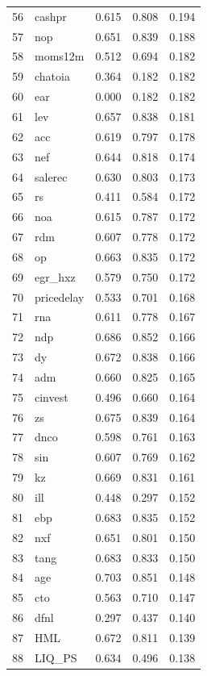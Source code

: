 \documentclass[12pt]{article}
\begin{document}
\begin{footnotesize}
\begin{longtable}{rl|c|c|c}
		56 & cashpr & 0.615 & 0.808 & 0.194 \\ 
		57 & nop & 0.651 & 0.839 & 0.188 \\ 
		58 & moms12m & 0.512 & 0.694 & 0.182 \\ 
		59 & chatoia & 0.364 & 0.182 & 0.182 \\ 
		60 & ear & 0.000 & 0.182 & 0.182 \\ 
		61 & lev & 0.657 & 0.838 & 0.181 \\ 
		62 & acc & 0.619 & 0.797 & 0.178 \\ 
		63 & nef & 0.644 & 0.818 & 0.174 \\ 
		64 & salerec & 0.630 & 0.803 & 0.173 \\ 
		65 & rs & 0.411 & 0.584 & 0.172 \\ 
		66 & noa & 0.615 & 0.787 & 0.172 \\ 
		67 & rdm & 0.607 & 0.778 & 0.172 \\ 
		68 & op & 0.663 & 0.835 & 0.172 \\ 
		69 & egr\_hxz & 0.579 & 0.750 & 0.172 \\ 
		70 & pricedelay & 0.533 & 0.701 & 0.168 \\ 
		71 & rna & 0.611 & 0.778 & 0.167 \\ 
		72 & ndp & 0.686 & 0.852 & 0.166 \\ 
		73 & dy & 0.672 & 0.838 & 0.166 \\ 
		74 & adm & 0.660 & 0.825 & 0.165 \\ 
		75 & cinvest & 0.496 & 0.660 & 0.164 \\ 
		76 & zs & 0.675 & 0.839 & 0.164 \\ 
		77 & dnco & 0.598 & 0.761 & 0.163 \\ 
		78 & sin & 0.607 & 0.769 & 0.162 \\ 
		79 & kz & 0.669 & 0.831 & 0.161 \\ 
		80 & ill & 0.448 & 0.297 & 0.152 \\ 
		81 & ebp & 0.683 & 0.835 & 0.152 \\ 
		82 & nxf & 0.651 & 0.801 & 0.150 \\ 
		83 & tang & 0.683 & 0.833 & 0.150 \\ 
		84 & age & 0.703 & 0.851 & 0.148 \\ 
		85 & cto & 0.563 & 0.710 & 0.147 \\ 
		86 & dfnl & 0.297 & 0.437 & 0.140 \\ 
		87 & HML & 0.672 & 0.811 & 0.139 \\ 
		88 & LIQ\_PS & 0.634 & 0.496 & 0.138 \\ 

\end{longtable}
\end{footnotesize}
\end{document}
